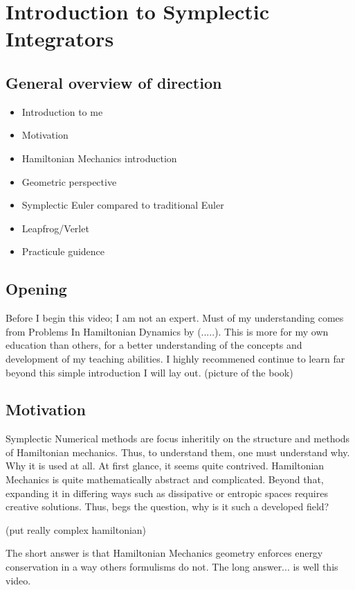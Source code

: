 \section{Introduction to Symplectic Integrators}

\subsection{General overview of direction}
\begin{itemize}
\item Introduction to me
\item Motivation
\item Hamiltonian Mechanics introduction
\item Geometric perspective
\item Symplectic Euler compared to traditional Euler
\item Leapfrog/Verlet
\item Practicule guidence
\end{itemize}

\subsection{Opening}

Before I begin this video; I am not an expert. Must of my understanding comes from Problems In Hamiltonian Dynamics by (.....). This is more for my own education than others, for a better understanding of the concepts and development of my teaching abilities. I highly recommened continue to learn far beyond this simple introduction I will lay out.
(picture of the book)
\subsection{Motivation}
Symplectic Numerical methods are focus inheritily on the structure and methods of Hamiltonian mechanics. Thus, to understand them, one must understand why. Why it is used at all. At first glance, it seems quite contrived. Hamiltonian Mechanics is quite mathematically abstract and complicated. Beyond that, expanding it in differing ways such as dissipative or entropic spaces requires creative solutions. Thus, begs the question, why is it such a developed field?

(put really complex hamiltonian)

The short answer is that Hamiltonian Mechanics geometry enforces energy conservation in a way others formulisms do not. The long answer... is well this video.


